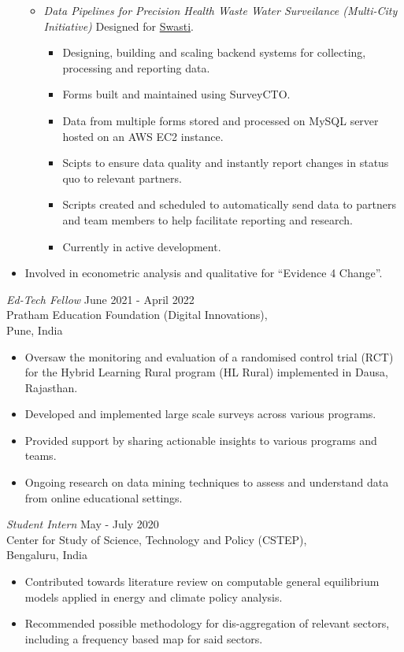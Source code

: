 \documentclass[margin]{res}
\begin{document}
\begin{resume}
\begin{itemize}
\begin{itemize}
		 \item \textit{Data Pipelines for Precision Health Waste Water Surveilance (Multi-City Initiative)} Designed for \href{https://swastihc.org}{Swasti}.
			\begin{itemize}
			\item Designing, building and scaling backend systems for collecting, processing and reporting data.
			 \item Forms built and maintained using SurveyCTO.
			 \item Data from multiple forms stored and processed on MySQL server hosted on an AWS EC2 instance.
			 \item Scipts to ensure data quality and instantly report changes in status quo to relevant partners.
			 \item Scripts created and scheduled to automatically send data to partners and team members to help facilitate reporting and research.
			 \item Currently in active development.
			\end{itemize}
		\end{itemize}
	\item Involved in econometric analysis and qualitative for ``Evidence 4 Change''.
\end{itemize}
{\sl Ed-Tech Fellow}                              \hfill June 2021 - April 2022\\
Pratham Education Foundation (Digital Innovations),\\
Pune, India
\begin{itemize} \itemsep -2pt
	\item Oversaw the monitoring and evaluation of a randomised control trial (RCT) for the Hybrid Learning Rural program (HL Rural) implemented in Dausa, Rajasthan.
	\item Developed and implemented large scale surveys across various programs. 
	\item Provided support by sharing actionable insights to various programs and teams.
	\item Ongoing research on data mining techniques to assess and understand data from online educational settings.
\end{itemize}
{\sl Student Intern}                              \hfill May - July 2020\\
Center for Study of Science, Technology and Policy (CSTEP),\\
Bengaluru, India
\begin{itemize} \itemsep -2pt
	\item Contributed towards literature review on computable general equilibrium models applied in energy and climate policy analysis.
	\item Recommended possible methodology for dis-aggregation of relevant sectors, including a frequency based map for said sectors.
\end{itemize}


\end{resume}
\end{document}
